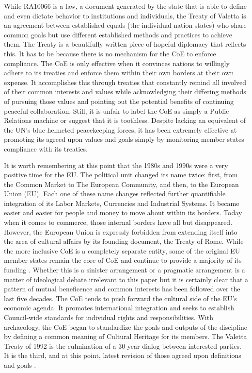 \documentclass[english]{ijsra}
\begin{document}
While RA10066 is a law, a document generated by the state that is able to define and even dictate behavior to institutions and individuals, the Treaty of Valetta is an agreement between established equals (the individual nation states) who share common goals but use different established methods and practices to achieve them. The Treaty is a beautifully written piece of hopeful diplomacy that reflects this. It has to be because there is no mechanism for the CoE to enforce compliance. The CoE is only effective when it convinces nations to willingly adhere to its treaties and enforce them within their own borders at their own expense. It accomplishes this through treaties that constantly remind all involved of their common interests and values while acknowledging their differing methods of pursuing those values and pointing out the potential benefits of continuing peaceful collaboration. Still, it is unfair to label the CoE as simply a Public Relations machine or suggest that it is toothless. Despite lacking an equivalent of the UN’s blue helmeted peacekeeping forces, it has been extremely effective at promoting its agreed upon values and goals simply by monitoring member states compliance with its treaties.   

It is worth remembering at this point that the 1980s and 1990s were a very positive time for the EU. The political unit changed its name twice: first, from the Common Market to The European Community, and then, to the European Union (EU). Each one of these name changes reflected further quantifiable integration of its Labor Markets, Currencies and Industrial Systems. It became easier and easier for people and money to move about within its borders. Today when it comes to commerce, those internal borders have all but disappeared. However, the European Union is expressly forbidden from extending itself into the area of cultural affairs by its founding document, the Treaty of Rome. While the more inclusive CoE is a completely separate entity, some of the original EU member states remain the core of CoE and continue to provide a majority of its funding \parencite[74]{CoE_2000}. 
Whether this is a sinister arrangement or a pragmatic arrangement is a matter of ideological debate irrelevant to this paper but it is certainly clear that a pattern of mutual beneficence and common interests has been followed over the last five decades. The CoE tends to push forward the cultural side of the EU’s economic agenda. It promotes international integration and seeks to establish Council-wide standards for individual rights and responsibilities. With archaeology, the CoE began to standardize the goals and outputs of the discipline by defining a common meaning of Cultural Heritage for its members. The Valetta Treaty of 1992 is the culmination of a 30 year dialog between interested parties. It is the third, and at this point, latest revision of those agreed upon definitions and goals \parencite{Valetta_1992}. 
\end{document}
